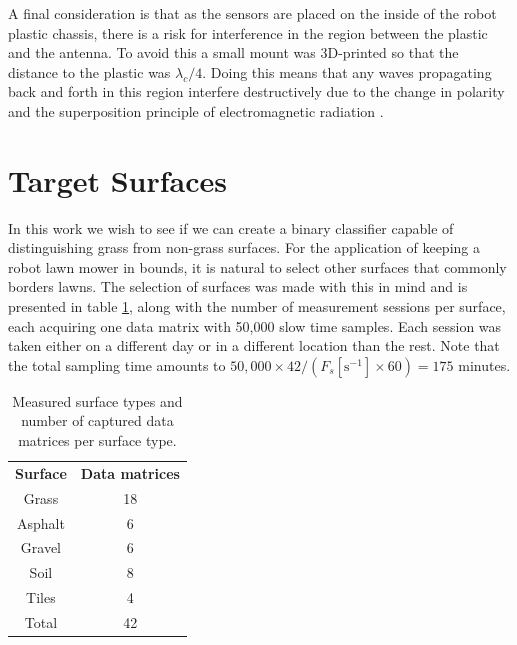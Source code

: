 A final consideration is that as the sensors are placed on the inside of the robot plastic chassis, there is a risk for interference in the region between the plastic and the antenna. To avoid this a small mount was 3D-printed so that the distance to the plastic was $\lambda_c/4$. Doing this means that any waves propagating back and forth in this region interfere destructively due to the change in polarity and the superposition principle of electromagnetic radiation \citep{griffiths_2018}.

\section{Target Surfaces}

In this work we wish to see if we can create a binary classifier capable of distinguishing grass from non-grass surfaces. For the application of keeping a robot lawn mower in bounds, it is natural to select other surfaces that commonly borders lawns. The selection of surfaces was made with this in mind and is presented in table \ref{tab:count}, along with the number of measurement sessions per surface, each acquiring one data matrix with 50,000 slow time samples. Each session was taken either on a different day or in a different location than the rest. Note that the total sampling time amounts to $50,000\times42/(F_s [\text{s}^{-1}]\times60)=175$ minutes.

\begin{table}
	\begin{center}
		\begin{tabular}{|c|c|}
			\hline
			\rowcolor{gray!150}\color{white}\textbf{Surface} & \color{white}\textbf{Data matrices} \\
			Grass & 18 \\
			\rowcolor{gray!25} Asphalt & 6 \\
			Gravel & 6 \\
			\rowcolor{gray!25} Soil & 8 \\
			Tiles & 4 \\ \hline
			\rowcolor{gray!25} Total & 42 \\
			\hline
		\end{tabular}
	\end{center}
	\caption{Measured surface types and number of captured data matrices per surface type.}
	\label{tab:count}
\end{table}

